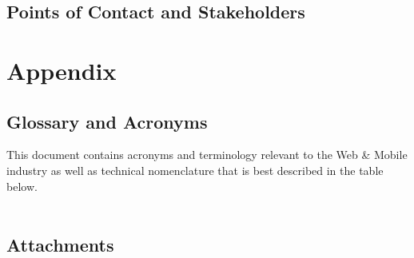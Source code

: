 \documentclass[a4paper,10pt,oneside,table,pdftex,dvipsnames]{report}
\begin{document}
\section{Points of Contact and Stakeholders}


\chapter{Appendix}

\section{Glossary and Acronyms}

This document contains acronyms and terminology relevant to the Web \& Mobile industry as well as technical nomenclature that is best described in the table below.
\\\\


\section{Attachments}

\end{document}
